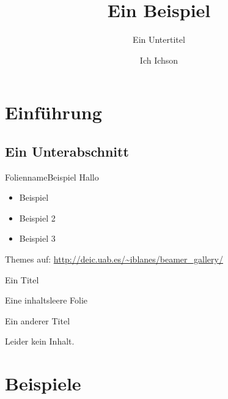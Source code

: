 \documentclass{beamer}
\author{Ich Ichson}
\title{Ein Beispiel}
\subtitle{Ein Untertitel}
\begin{document}
\begin{frame}
\maketitle
\end{frame}

\begin{frame}
\tableofcontents
\end{frame}

\section{Einführung}

\subsection{Ein Unterabschnitt}

\begin{frame}{Folienname}{Beispiel}
Hallo

\begin{itemize}
\item Beispiel
\item Beispiel 2
\item Beispiel 3
\end{itemize}


Themes auf:
\url{http://deic.uab.es/~iblanes/beamer_gallery/}

\end{frame}

\begin{frame}{Ein Titel}

Eine inhaltsleere Folie

\end{frame}

\begin{frame}{Ein anderer Titel}

Leider kein Inhalt.

\end{frame}

\section{Beispiele}
\end{document}
